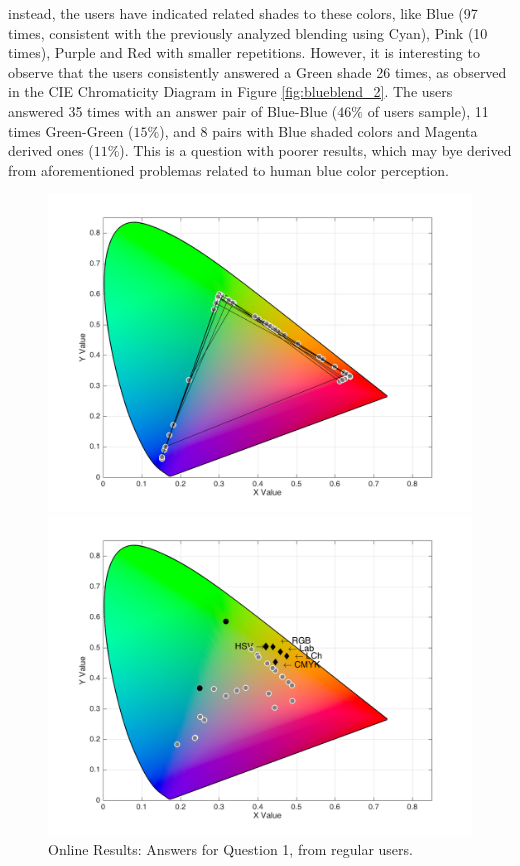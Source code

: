 instead, the users have indicated related shades to these colors,
like Blue (97 times, consistent with the previously analyzed blending using Cyan), Pink (10 times), Purple and Red with smaller repetitions.
However, it is interesting to observe that the users consistently answered a Green shade 26 times, as observed in the CIE Chromaticity Diagram
in Figure \ref{fig:blueblend_2}. The users answered 35 times with an answer pair of Blue-Blue ($46\%$ of users sample), 11 times Green-Green ($15\%$),
and 8 pairs with Blue shaded colors and Magenta derived ones ($11\%$). This is a question with poorer results, which may bye derived from aforementioned
problemas related to human blue color perception.
%
\begin{figure}[!htbp]
  \centering
  \begin{minipage}{0.48\textwidth}
    \centering
    \includegraphics[width=\textwidth]{images/results/1_online_regularUsers.png}
    \caption[Online Results: Answers for Question 1, from regular users.]{Online Results: Answers for Question 1, from regular users.}
    \label{fig:yellowblend_1}
  \end{minipage}\hfill
  \begin{minipage}{0.48\textwidth}
    \centering
    \includegraphics[width=\textwidth]{images/results/18_online_regularUsers.png}

\end{minipage}
\end{figure}
